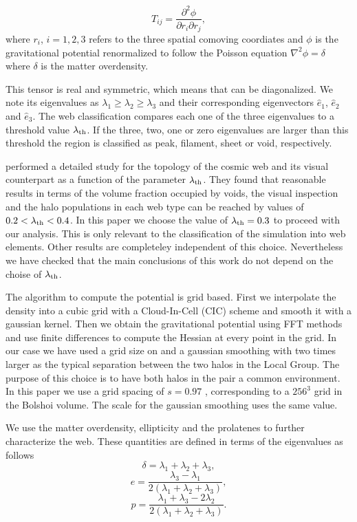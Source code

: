 \documentclass{emulateapj}
\newcommand{\manuscript}{paper }
\newcommand{\hMpc}{{\ifmmode{h^{-1}{\rm Mpc}}\else{$h^{-1}$Mpc }\fi}}
\begin{document}
\begin{equation}
T_{ij} = \frac{\partial^2 \phi}{\partial r_i \partial r_j}, 
\end{equation}
%
where $r_{i}$, $i=1,2,3$ refers to the three spatial comoving
coordiates and $\phi$ is the gravitational potential renormalized to
follow the Poisson equation $\nabla^2\phi=\delta$ where
$\delta$ is the matter overdensity.  

This tensor is real and symmetric, which means that can be
diagonalized. 
We note its eigenvalues as $\lambda_1\geq \lambda_2\geq
\lambda_3$ and their corresponding eigenvectors $\hat{e}_1$,
$\hat{e}_2$ and $\hat{e}_3$. 
The web classification compares each one
of the three eigenvalues to a threshold value $\lambda_{\rm th}$. 
If
the three, two, one or zero eigenvalues are larger than this threshold
the region is classified as peak, filament, sheet or void,
respectively.  

\cite{Tweb} performed a detailed study for the topology of the
cosmic web and its visual counterpart as a function of the parameter
$\lambda_{\rm th}$. 
They found that reasonable results in terms of the
volume fraction occupied by voids, the visual inspection and the halo
populations in each web type can be reached by values of $0.2<\lambda_{\rm
th}<0.4$. 
In this \manuscript we choose the value of $\lambda_{\rm
  th}=0.3$ to proceed with our analysis. 
This is only relevant to the classification of the simulation into web
elements. Other results are completeley independent of this
choice. Nevertheless we have checked that the main conclusions of this
work do not depend on the choise of $\lambda_{\rm th}$.


The algorithm to compute the potential is grid based. 
First we interpolate the density into a cubic grid with a
Cloud-In-Cell (CIC) scheme and smooth it with a gaussian kernel. 
Then we obtain the gravitational potential using FFT methods and use finite differences
to compute the Hessian at every point in the grid. 
In our case we have used a grid size on and a gaussian smoothing with
two times larger as the typical separation between the two halos in the Local Group. 
The purpose of this choice is to have both halos in the pair a common
environment. 
In this \manuscript we use a grid spacing of $s=0.97$ \hMpc,
corresponding to a $256^3$ grid in the Bolshoi volume. 
The scale for the gaussian smoothing uses the same value.

We use the matter overdensity, ellipticity and the prolatenes to
further characterize the web. 
These quantities are defined in terms of the
eigenvalues as follows 
%
\begin{equation}
\delta = \lambda_1 + \lambda_2 + \lambda_3,
\end{equation}
%
\begin{equation}
e= \frac{\lambda_3 - \lambda_1}{2(\lambda_1 + \lambda_2 + \lambda_3)}, 
\end{equation}
%
\begin{equation}
p= \frac{\lambda_1 + \lambda_3 - 2\lambda_2}{2(\lambda_1 + \lambda_2 +
  \lambda_3)}.
\end{equation}
\end{document}
